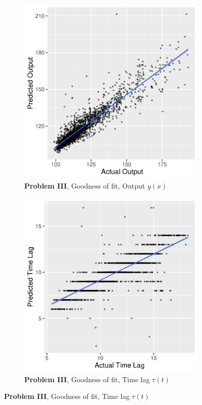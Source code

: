 \documentclass[envcountsect,runningheads]{llncs}
\theoremstyle{etoile}
\begin{document}
\begin{figure}
  \centering

  \begin{subfigure}[b]{0.4\textwidth}
    \centering
    \includegraphics[width=\textwidth]{figures/exp3_scatter_v_test}
    \caption{ \textbf{Problem III}, Goodness of fit, Output $y(x)$}
    \label{fig:problem3_fitv}
  \end{subfigure}
  \hfill
  \begin{subfigure}[b]{0.4\textwidth}
    \centering
    \includegraphics[width=\textwidth]{figures/exp3_scatter_t_test}
    \caption{ \textbf{Problem III}, Goodness of fit, Time lag $\tau(t)$ }
    \label{fig:problem3_fitt}
  \end{subfigure}


\end{figure}
\end{document}
